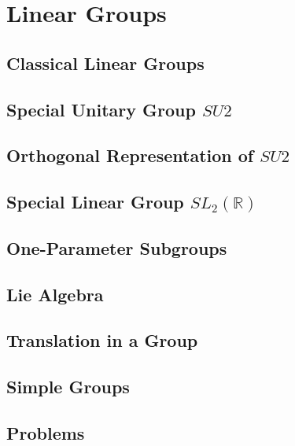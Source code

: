 \chapter{Linear Groups}
\section{Classical Linear Groups}
\section{Special Unitary Group $SU2$}
\section{Orthogonal Representation of $SU2$}
\section{Special Linear Group $SL_2(\mathbb{R})$}
\section{One-Parameter Subgroups}
\section{Lie Algebra}
\section{Translation in a Group}
\section{Simple Groups}
\section{Problems}